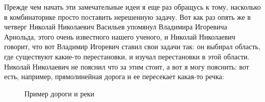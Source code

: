 \documentclass[russian]{lecture-notes}
\theoremstyle{definition}
\begin{document}
	Прежде чем начать эти замечательные идеи я еще раз обращусь к тому, насколько в комбинаторике просто поставить нерешенную задачу. Вот как раз опять же в четверг Николай Николаевич Васильев упомянул Владимира Игоревича Арнольда, этого очень известного нашего ученого, и Николай Николаевич говорит, что вот Владимир Игоревич ставил свои задачи так: он выбирал область, где существуют какие-то перестановки, и изучал перестановки в этой области. Николай Николаевич не пояснил что за этим стоит, а вот я могу пояснить: вот есть, например, прямолинейная дорога и ее пересекает какая-то речка:
	\begin{figure}[H]
		\centering
		\caption{\small Пример дороги и реки}
	\end{figure}
\end{document}
